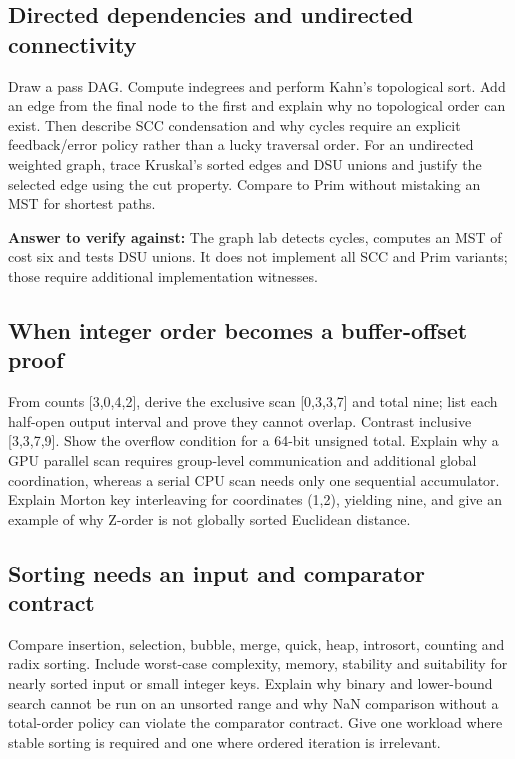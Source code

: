 \subsection{Directed dependencies and undirected connectivity}\label{appendix-8a046b38375e-directed-dependencies-and-undirected-connectivity}

Draw a pass DAG. Compute indegrees and perform Kahn's topological sort. Add an edge from the final node to the first and explain why no topological order can exist. Then describe SCC condensation and why cycles require an explicit feedback/error policy rather than a lucky traversal order. For an undirected weighted graph, trace Kruskal's sorted edges and DSU unions and justify the selected edge using the cut property. Compare to Prim without mistaking an MST for shortest paths.

\textbf{Answer to verify against:} The graph lab detects cycles, computes an MST of cost six and tests DSU unions. It does not implement all SCC and Prim variants; those require additional implementation witnesses.

\subsection{When integer order becomes a buffer-offset proof}\label{appendix-8a046b38375e-when-integer-order-becomes-a-buffer-offset-proof}

From counts {[}3,0,4,2{]}, derive the exclusive scan {[}0,3,3,7{]} and total nine; list each half-open output interval and prove they cannot overlap. Contrast inclusive {[}3,3,7,9{]}. Show the overflow condition for a 64-bit unsigned total. Explain why a GPU parallel scan requires group-level communication and additional global coordination, whereas a serial CPU scan needs only one sequential accumulator. Explain Morton key interleaving for coordinates (1,2), yielding nine, and give an example of why Z-order is not globally sorted Euclidean distance.

\subsection{Sorting needs an input and comparator contract}\label{appendix-8a046b38375e-sorting-needs-an-input-and-comparator-contract}

Compare insertion, selection, bubble, merge, quick, heap, introsort, counting and radix sorting. Include worst-case complexity, memory, stability and suitability for nearly sorted input or small integer keys. Explain why binary and lower-bound search cannot be run on an unsorted range and why NaN comparison without a total-order policy can violate the comparator contract. Give one workload where stable sorting is required and one where ordered iteration is irrelevant.

